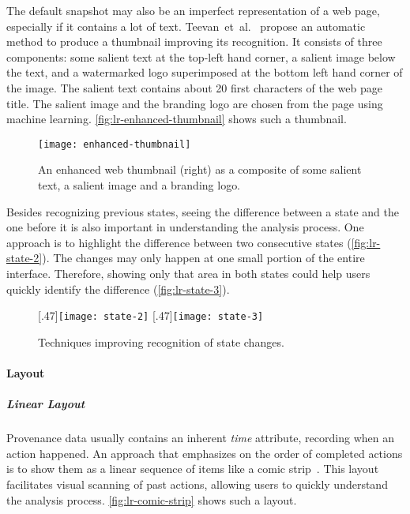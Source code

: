 The default snapshot may also be an imperfect representation of a web page, especially if it contains a lot of text. Teevan~et~al.~\cite{Teevan2009} propose an automatic method to produce a thumbnail improving its recognition. It consists of three components: some salient text at the top-left hand corner, a salient image below the text, and a watermarked logo superimposed at the bottom left hand corner of the image. The salient text contains about 20 first characters of the web page title. The salient image and the branding logo are chosen from the page using machine learning. \autoref{fig:lr-enhanced-thumbnail} shows such a thumbnail.

\begin{figure}[!htb]
	\centering
	\texttt{[image: enhanced-thumbnail]}
	\caption{An enhanced web thumbnail (right) as a composite of some salient text, a salient image and a branding logo. }
	\label{fig:lr-enhanced-thumbnail}
\end{figure}

Besides recognizing previous states, seeing the difference between a state and the one before it is also important in understanding the analysis process. One approach is to highlight the difference between two consecutive states (\autoref{fig:lr-state-2}). The changes may only happen at one small portion of the entire interface. Therefore, showing only that area in both states could help users quickly identify the difference (\autoref{fig:lr-state-3}).

\begin{figure}[!htb]
\centering
{}[.47\columnwidth]{\texttt{[image: state-2]}} 
\hfill
{}[.47\columnwidth]{\texttt{[image: state-3]}}
\caption{Techniques improving recognition of state changes.}
\end{figure}

\paragraph{Layout}

\subparagraph{Linear Layout}
Provenance data usually contains an inherent \emph{time} attribute, recording when an action happened. An approach that emphasizes on the order of completed actions is to show them as a linear sequence of items like a comic strip~\cite{Kurlander1988,Meng1998}. This layout facilitates visual scanning of past actions, allowing users to quickly understand the analysis process. \autoref{fig:lr-comic-strip} shows such a layout.

